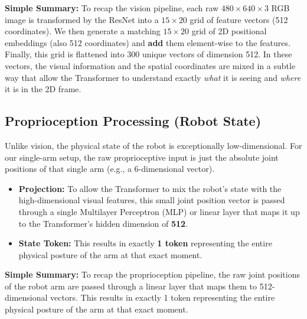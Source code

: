 \documentclass[11pt,a4paper]{article}
\begin{document}
\textbf{Simple Summary:} To recap the vision pipeline, each raw $480 \times 640 \times 3$ RGB image is transformed by the ResNet into a $15 \times 20$ grid of feature vectors (512 coordinates). We then generate a matching $15 \times 20$ grid of 2D positional embeddings (also 512 coordinates) and \textbf{add} them element-wise to the features. Finally, this grid is flattened into 300 unique vectors of dimension 512. In these vectors, the visual information and the spatial coordinates are mixed in a subtle way that allow the Transformer to understand exactly \textit{what} it is seeing and \textit{where} it is in the 2D frame.

\subsection{Proprioception Processing (Robot State)}
Unlike vision, the physical state of the robot is exceptionally low-dimensional. For our single-arm setup, the raw proprioceptive input is just the absolute joint positions of that single arm (e.g., a 6-dimensional vector).

\begin{itemize}
    \item \textbf{Projection:} To allow the Transformer to mix the robot's state with the high-dimensional visual features, this small joint position vector is passed through a single Multilayer Perceptron (MLP) or linear layer that maps it up to the Transformer's hidden dimension of \textbf{512}.
    \item \textbf{State Token:} This results in exactly \textbf{1 token} representing the entire physical posture of the arm at that exact moment.
\end{itemize}

\textbf{Simple Summary:} To recap the proprioception pipeline, the raw joint positions of the robot arm are passed through a linear layer that maps them to 512-dimensional vectors. This results in exactly 1 token representing the entire physical posture of the arm at that exact moment.
\end{document}
